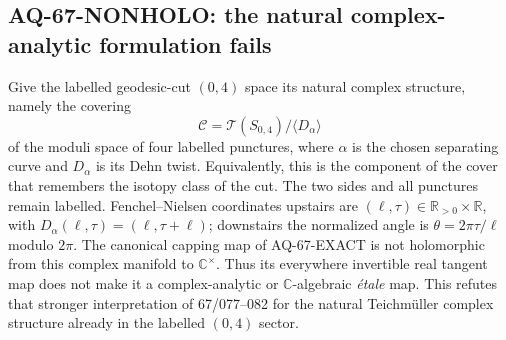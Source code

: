 \documentclass[11pt,a4paper]{article}
\theoremstyle{definition}\newtheorem{definition}[theorem]{Definition}
\theoremstyle{remark}\newtheorem{remark}[theorem]{Remark}
\begin{document}
\subsection{AQ-67-NONHOLO: the natural complex-analytic formulation fails}
Give the labelled geodesic-cut $(0,4)$ space its natural complex
structure, namely the covering
\[
 \mathcal C=\mathcal T(S_{0,4})/\langle D_\alpha\rangle
\]
of the moduli space of four labelled punctures, where $\alpha$ is
the chosen separating curve and $D_\alpha$ is its Dehn twist.
Equivalently, this is the component of the cover that remembers
the isotopy class of the cut. The two sides and all punctures
remain labelled. Fenchel--Nielsen coordinates upstairs are
$(\ell,\tau)\in\mathbb R_{>0}\times\mathbb R$, with
$D_\alpha(\ell,\tau)=(\ell,\tau+\ell)$; downstairs the
normalized angle is $\theta=2\pi\tau/\ell$ modulo $2\pi$.
The canonical capping map of AQ-67-EXACT is not holomorphic
from this complex manifold to $\mathbb C^\times$.
Thus its everywhere invertible real tangent map does not make
it a complex-analytic or $\mathbb C$-algebraic \emph{\'etale}
map. This refutes that stronger interpretation of 67/077--082
for the natural Teichm\"uller complex structure already in
the labelled $(0,4)$ sector.
\end{document}
